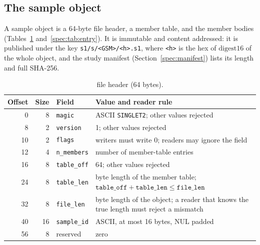 \subsection{The sample object}
\label{spec:container}
A sample object is a 64-byte file header, a member table, and the member bodies (Tables~\ref{spec:tab:filehdr}
and~\ref{spec:tab:entry}). It is immutable and content addressed: it is published under the key
\texttt{s1/s/<GSM>/<h>.s1}, where \texttt{<h>} is the hex of $\mathrm{digest16}$ of the whole object, and the study
manifest (Section~\ref{spec:manifest}) lists its length and full SHA-256.

\begin{table}[htbp]
\centering\footnotesize\setlength{\tabcolsep}{4pt}
\caption{\sone{} file header (64 bytes).}
\label{spec:tab:filehdr}
\begin{tabularx}{\linewidth}{@{}rrlX@{}}
\toprule
Offset & Size & Field & Value and reader rule \\
\midrule
0  & 8  & \texttt{magic}      & ASCII \texttt{SINGLET2}; other values rejected \\
8  & 2  & \texttt{version}    & 1; other values rejected \\
10 & 2  & \texttt{flags}      & writers must write 0; readers may ignore the field \\
12 & 4  & \texttt{n\_members} & number of member-table entries \\
16 & 8  & \texttt{table\_off} & 64; other values rejected \\
24 & 8  & \texttt{table\_len} & byte length of the member table; $\texttt{table\_off}+\texttt{table\_len}\le\texttt{file\_len}$ \\
32 & 8  & \texttt{file\_len}  & byte length of the object; a reader that knows the true length must reject a mismatch \\
40 & 16 & \texttt{sample\_id} & ASCII, at most 16 bytes, NUL padded \\
56 & 8  & reserved            & zero \\
\bottomrule
\end{tabularx}
\end{table}

